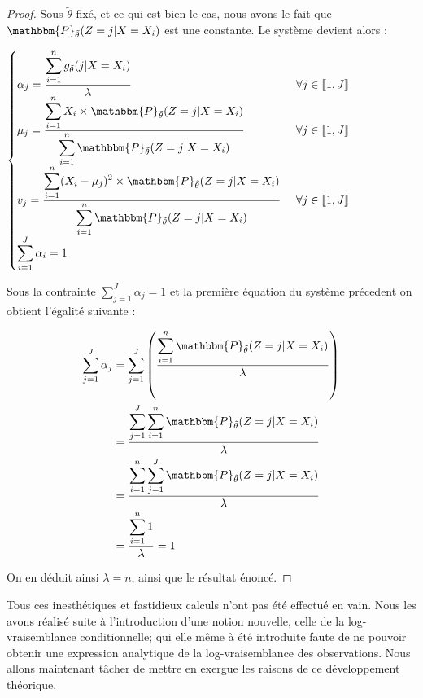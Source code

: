 \documentclass[frenchb]{report}
\newcommand{\1}{\mathbbm{1}}
\newcommand{\prob}{\mathbbm{P}}
\newcommand{\thetat}{\tilde{\theta}}
\theoremstyle{definition}\newtheorem{defn}{Définition}
\theoremstyle{definition}\newtheorem{exm}{Exemple}
\theoremstyle{definition}\newtheorem{nota}{Notation}
\theoremstyle{definition}\newtheorem{rem}{Remarque}
\begin{document}
\begin{proof}
Sous $\thetat$ fixé, et ce qui est bien le cas, nous avons le fait que $\prob_{\thetat}(Z=j|X=X_i)$ est une constante. 
Le système devient alors :

$
\begin{cases}
\alpha_j =\displaystyle \frac{\displaystyle\sum_{i=1}^n g_{\thetat}(j|X=X_i)}{\lambda} &\text{ } \forall j \in \llbracket 1,J \rrbracket \\
\mu_j =\displaystyle \frac{\displaystyle\sum_{i=1}^n X_i\times\prob_{\thetat}(Z=j|X=X_i)}{\displaystyle\sum_{i=1}^n \prob_{\thetat}(Z=j|X=X_i)} &\text{ } \forall j \in \llbracket 1,J \rrbracket \\
v_j = \displaystyle\frac{\displaystyle\sum_{i=1}^n (X_i -\mu_j)^2 \times\prob_{\thetat}(Z=j|X=X_i)}{\displaystyle\displaystyle\sum_{i=1}^n\prob_{\thetat}(Z=j|X=X_i)} &\text{ } \forall j \in \llbracket 1,J \rrbracket \\
\displaystyle\sum_{i=1}^J\alpha_i =1 
\end{cases}
$

Sous la contrainte $\displaystyle\sum_{j=1}^J\alpha_j =1$ et la première équation du système précedent on obtient l'égalité suivante : 

\begin{align*}
\sum_{j=1}^J\alpha_j &= \sum_{j=1}^J \left(\frac{\displaystyle\sum_{i=1}^n \prob_{\thetat}(Z=j|X=X_i)}{\lambda}\right)\\
&=\displaystyle\frac{\displaystyle\sum_{j=1}^J \sum_{i=1}^n \prob_{\thetat}(Z=j|X=X_i)}{\lambda}\\
&=\displaystyle\frac{\displaystyle\sum_{i=1}^n \sum_{j=1}^J \prob_{\thetat}(Z=j|X=X_i)}{\lambda}\\
&=\displaystyle\frac{\displaystyle\sum_{i=1}^n 1}{\lambda}= 1\\
\end{align*}

On en déduit ainsi $\lambda = n$, ainsi que le résultat énoncé.
\end{proof}


Tous ces inesthétiques et fastidieux calculs n'ont pas été effectué en vain. Nous les avons réalisé suite à l'introduction d'une notion nouvelle, celle de la log-vraisemblance conditionnelle; qui elle même à été introduite faute de ne pouvoir obtenir une expression analytique de la log-vraisemblance des observations. Nous allons maintenant tâcher de mettre en exergue les raisons de ce développement théorique.

\pagebreak
\end{document}
